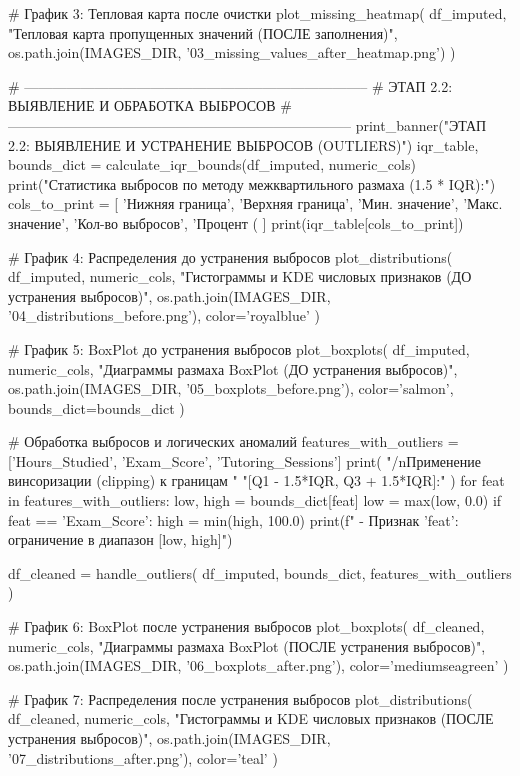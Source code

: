 \documentclass[14pt,a4paper]{extarticle}
\begin{document}
\begin{CodeListing}
    # График 3: Тепловая карта после очистки
    plot_missing_heatmap(
        df_imputed,
        "Тепловая карта пропущенных значений (ПОСЛЕ заполнения)",
        os.path.join(IMAGES_DIR, '03_missing_values_after_heatmap.png')
    )

    # --------------------------------------------------------------------------
    # ЭТАП 2.2: ВЫЯВЛЕНИЕ И ОБРАБОТКА ВЫБРОСОВ
    # --------------------------------------------------------------------------
    print_banner("ЭТАП 2.2: ВЫЯВЛЕНИЕ И УСТРАНЕНИЕ ВЫБРОСОВ (OUTLIERS)")
    iqr_table, bounds_dict = calculate_iqr_bounds(df_imputed, numeric_cols)
    print("Статистика выбросов по методу межквартильного размаха (1.5 * IQR):")
    cols_to_print = [
        'Нижняя граница', 'Верхняя граница', 'Мин. значение',
        'Макс. значение', 'Кол-во выбросов', 'Процент (%
    ]
    print(iqr_table[cols_to_print])

    # График 4: Распределения до устранения выбросов
    plot_distributions(
        df_imputed, numeric_cols,
        "Гистограммы и KDE числовых признаков (ДО устранения выбросов)",
        os.path.join(IMAGES_DIR, '04_distributions_before.png'),
        color='royalblue'
    )

    # График 5: BoxPlot до устранения выбросов
    plot_boxplots(
        df_imputed, numeric_cols,
        "Диаграммы размаха BoxPlot (ДО устранения выбросов)",
        os.path.join(IMAGES_DIR, '05_boxplots_before.png'),
        color='salmon',
        bounds_dict=bounds_dict
    )

    # Обработка выбросов и логических аномалий
    features_with_outliers = ['Hours_Studied', 'Exam_Score', 'Tutoring_Sessions']
    print(
        "/nПрименение винсоризации (clipping) к границам "
        "[Q1 - 1.5*IQR, Q3 + 1.5*IQR]:"
    )
    for feat in features_with_outliers:
        low, high = bounds_dict[feat]
        low = max(low, 0.0)
        if feat == 'Exam_Score':
            high = min(high, 100.0)
        print(f"  - Признак '{feat}': ограничение в диапазон [{low}, {high}]")

    df_cleaned = handle_outliers(
        df_imputed, bounds_dict, features_with_outliers
    )

    # График 6: BoxPlot после устранения выбросов
    plot_boxplots(
        df_cleaned, numeric_cols,
        "Диаграммы размаха BoxPlot (ПОСЛЕ устранения выбросов)",
        os.path.join(IMAGES_DIR, '06_boxplots_after.png'),
        color='mediumseagreen'
    )

    # График 7: Распределения после устранения выбросов
    plot_distributions(
        df_cleaned, numeric_cols,
        "Гистограммы и KDE числовых признаков (ПОСЛЕ устранения выбросов)",
        os.path.join(IMAGES_DIR, '07_distributions_after.png'),
        color='teal'
    )


\end{CodeListing}
\end{document}
